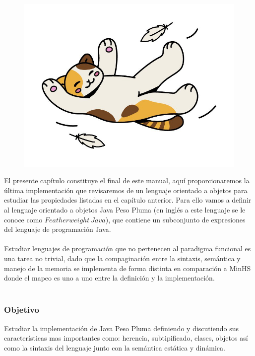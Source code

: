 
\begin{figure}[htbp]
    \centerline{\includegraphics[scale=.4]{assets/11_gatito_cayendo.jpg}}
\end{figure} 
\bigskip

El presente capítulo constituye el final de este manual, aquí proporcionaremos la última implementación que revisaremos de un lenguaje orientado a objetos para estudiar las propiedades listadas en el capítulo anterior.
Para ello vamos a definir al lenguaje orientado a objetos \textsf{Java Peso Pluma} (en inglés a este lenguaje se le conoce como $Featherweight\ Java$), que contiene un subconjunto de expresiones del lenguaje de programación \textsf{Java}.\\\\
Estudiar lenguajes de programación que no pertenecen al paradigma funcional es una tarea no trivial, dado que la compaginación entre la sintaxis, semántica y manejo de la memoria se implementa de forma distinta en comparación a \textsf{MinHS} donde el mapeo es uno a uno entre la definición y la implementación.\\\\

\subsubsection{Objetivo}
Estudiar la implementación de \textsf{Java Peso Pluma} definiendo y discutiendo sus características mas importantes como: herencia, subtipificado, clases, objetos así como la sintaxis del lenguaje junto con la semántica estática y dinámica.\\


